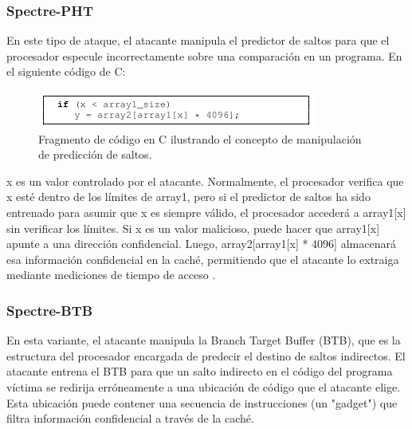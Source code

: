 \documentclass[lettersize,compsoc]{IEEEtran}
\begin{document}
\subsubsection{\textbf{Spectre-PHT}}
En este tipo de ataque, el atacante manipula el predictor de saltos para que el procesador especule incorrectamente sobre una comparación en un programa.
En el siguiente código de C:

\begin{figure}[h]
  \centering
  \includegraphics[width=\linewidth]{codigo_c.png}
  \caption{\small Fragmento de código en C ilustrando el concepto de manipulación de predicción de saltos.}
  \label{fig:etiqueta}
\end{figure}

x es un valor controlado por el atacante. Normalmente, el procesador verifica que x esté dentro de los límites de array1, pero si el predictor de saltos ha sido entrenado para asumir que x es siempre válido, el procesador accederá a array1[x] sin verificar los límites.
Si x es un valor malicioso, puede hacer que array1[x] apunte a una dirección confidencial. Luego, array2[array1[x] * 4096] almacenará esa información confidencial en la caché, permitiendo que el atacante lo extraiga mediante mediciones de tiempo de acceso \cite{spectre}.

\subsubsection{\textbf{Spectre-BTB}}
En esta variante, el atacante manipula la Branch Target Buffer (BTB), que es la estructura del procesador encargada de predecir el destino de saltos indirectos.
El atacante entrena el BTB para que un salto indirecto en el código del programa víctima se redirija erróneamente a una ubicación de código que el atacante elige. Esta ubicación puede contener una secuencia de instrucciones (un "gadget") que filtra información confidencial a través de la caché.
\end{document}
